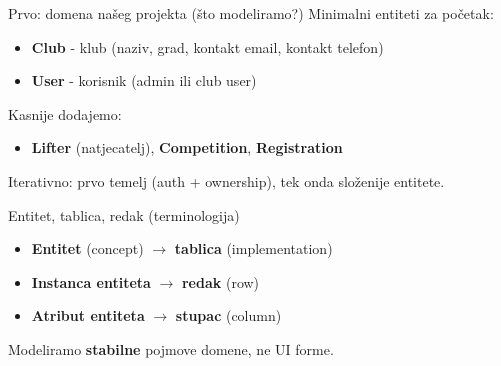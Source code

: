 	\begin{frame}{Prvo: domena našeg projekta (što modeliramo?)}
		Minimalni entiteti za početak:
		\begin{itemize}
			\item \textbf{Club} - klub (naziv, grad, kontakt email, kontakt telefon)
			\item \textbf{User} - korisnik (admin ili club user)
		\end{itemize}
		
		\vspace{0.6em}
		Kasnije dodajemo:
		\begin{itemize}
			\item \textbf{Lifter} (natjecatelj), \textbf{Competition}, \textbf{Registration}
		\end{itemize}
		
		\vspace{0.6em}
		Iterativno: prvo temelj (auth + ownership), tek onda složenije entitete.
	\end{frame}
	
	\begin{frame}{Entitet, tablica, redak (terminologija)}
		\begin{itemize}
			\item \textbf{Entitet} (concept) $\rightarrow$ \textbf{tablica} (implementation)
			\item \textbf{Instanca entiteta} $\rightarrow$ \textbf{redak} (row)
			\item \textbf{Atribut entiteta} $\rightarrow$ \textbf{stupac} (column)
		\end{itemize}
		
		\vspace{0.6em}
		Modeliramo \textbf{stabilne} pojmove domene, ne UI forme.
	\end{frame}
	
